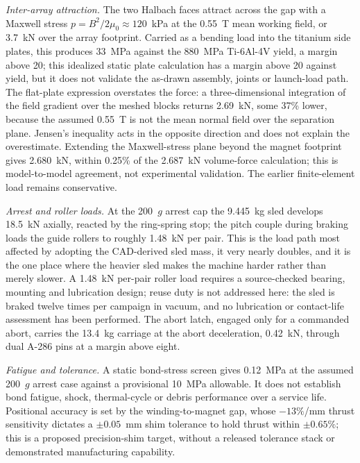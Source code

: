 \documentclass[conference]{IEEEtran}
\begin{document}
\emph{Inter-array attraction.} The two Halbach faces attract across the gap with a Maxwell stress $p=B^2/2\mu_0\approx120$~kPa at the 0.55~T mean working field, or 3.7~kN over the array footprint. Carried as a bending load into the titanium side plates, this produces 33~MPa against the 880~MPa Ti-6Al-4V yield, a margin above 20; this idealized static plate calculation has a margin above 20 against yield, but it does not validate the as-drawn assembly, joints or launch-load path. The flat-plate expression overstates the force: a three-dimensional integration of the field gradient over the meshed blocks returns 2.69~kN, some 37\% lower, because the assumed 0.55~T is not the mean normal field over the separation plane. Jensen's inequality acts in the opposite direction and does not explain the overestimate. Extending the Maxwell-stress plane beyond the magnet footprint gives 2.680~kN, within 0.25\% of the 2.687~kN volume-force calculation; this is model-to-model agreement, not experimental validation. The earlier finite-element load remains conservative.

\emph{Arrest and roller loads.} At the 200~$g$ arrest cap the 9.445~kg sled develops 18.5~kN axially, reacted by the ring-spring stop; the pitch couple during braking loads the guide rollers to roughly 1.48~kN per pair. This is the load path most affected by adopting the CAD-derived sled mass, it very nearly doubles, and it is the one place where the heavier sled makes the machine harder rather than merely slower. A 1.48~kN per-pair roller load requires a source-checked bearing, mounting and lubrication design; reuse duty is not addressed here: the sled is braked twelve times per campaign in vacuum, and no lubrication or contact-life assessment has been performed. The abort latch, engaged only for a commanded abort, carries the 13.4~kg carriage at the abort deceleration, 0.42~kN, through dual A-286 pins at a margin above eight.

\emph{Fatigue and tolerance.} A static bond-stress screen gives 0.12~MPa at the assumed 200~$g$ arrest case against a provisional 10~MPa allowable. It does not establish bond fatigue, shock, thermal-cycle or debris performance over a service life. Positional accuracy is set by the winding-to-magnet gap, whose $-13\%$/mm thrust sensitivity dictates a $\pm0.05$~mm shim tolerance to hold thrust within $\pm0.65\%$; this is a proposed precision-shim target, without a released tolerance stack or demonstrated manufacturing capability.
\end{document}
